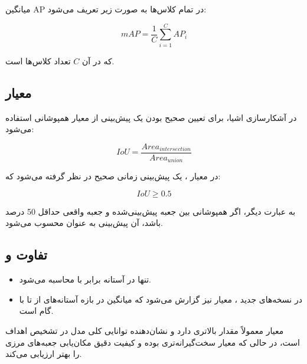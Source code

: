\documentclass[a4paper, 10pt, twocolumn]{article}
\begin{document}
	میانگین AP در تمام کلاس‌ها به صورت زیر تعریف می‌شود:
	
	\begin{equation}
		mAP = \frac{1}{C} \sum_{i=1}^{C} AP_i
	\end{equation}
	
	که در آن $C$ تعداد کلاس‌ها است.
	
	\subsection{معیار }
	
	در آشکارسازی اشیا، برای تعیین صحیح بودن یک پیش‌بینی از معیار همپوشانی  استفاده می‌شود:
	
	\begin{equation}
		IoU = \frac{Area_{intersection}}{Area_{union}}
	\end{equation}
	
	در معیار ، یک پیش‌بینی زمانی صحیح در نظر گرفته می‌شود که:
	
	\begin{equation}
		IoU \geq 0.5
	\end{equation}
	
	به عبارت دیگر، اگر همپوشانی بین جعبه پیش‌بینی‌شده و جعبه واقعی حداقل 50 درصد باشد، آن پیش‌بینی به عنوان  محسوب می‌شود.
	
	
	
	
	\subsection{تفاوت  و }
	
	\begin{itemize}
		\item {} تنها در آستانه  برابر با  محاسبه می‌شود.
		\item در نسخه‌های جدید ، معیار  نیز گزارش می‌شود که میانگین  در بازه آستانه‌های  از  تا  با گام  است.
	\end{itemize}
	
	معیار  معمولاً مقدار بالاتری دارد و نشان‌دهنده توانایی کلی مدل در تشخیص اهداف است، در حالی که  معیار سخت‌گیرانه‌تری بوده و کیفیت دقیق مکان‌یابی جعبه‌های مرزی را بهتر ارزیابی می‌کند.
	
\end{document}
